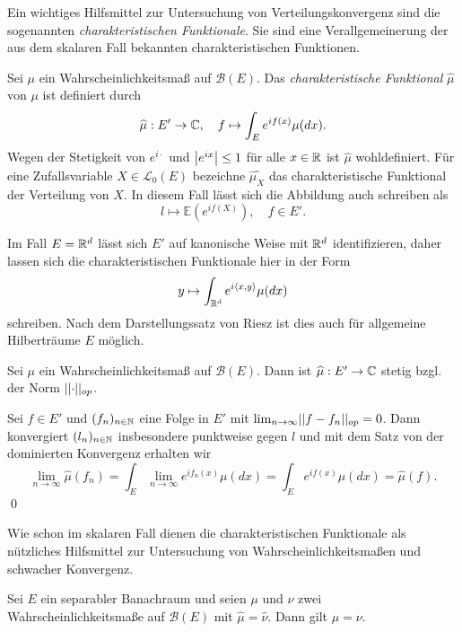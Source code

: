 Ein wichtiges Hilfsmittel zur Untersuchung von Verteilungskonvergenz sind die sogenannten \textit{charakteristischen Funktionale}. 
Sie sind eine Verallgemeinerung der aus dem skalaren Fall bekannten charakteristischen Funktionen.  

\begin{mydef}
    Sei $\mu$ ein Wahrscheinlichkeitsmaß auf $\mathcal{B}(E)$. 
    Das \textit{charakteristische Funktional} $\widehat{\mu}$ von $\mu$ ist definiert durch
    $$
        \widehat{\mu} : E' \to \mathbb{C}, \quad f \mapsto \int_{E}e^{if(x)}\mu(dx).
    $$
    Wegen der Stetigkeit von $e^{i\cdot}$ und $\left| e^{ix} \right|\leq 1$ für alle $x \in \mathbb{R}$ ist $\widehat{\mu}$ wohldefiniert. 
    Für eine Zufallsvariable $X \in \mathcal{L}_0(E)$ bezeichne $\widehat{\mu_X}$ das charakteristische Funktional der Verteilung von $X$. In diesem Fall lässt sich die Abbildung auch schreiben als
    $$
        l \mapsto \mathbb{E}(e^{if(X)}), \quad f \in E'. 
    $$
\end{mydef}

\begin{remark}
    Im Fall $E = \mathbb{R}^d$ lässt sich $E'$ auf kanonische Weise mit $\mathbb{R}^d$ identifizieren, daher lassen sich die charakteristischen Funktionale hier in der Form 
    $$
        y \mapsto \int_{\mathbb{R}^d}e^{i\langle x, y\rangle}\mu(dx)
    $$
    schreiben. Nach dem Darstellungssatz von Riesz ist dies auch für allgemeine Hilberträume $E$ möglich. 
\end{remark}

\begin{proposition}
    Sei $\mu$ ein Wahrscheinlichkeitsmaß auf $\mathcal{B}(E)$. Dann ist $\widehat{\mu}:E' \to \mathbb{C}$ stetig bzgl. der Norm $\lvert\lvert \cdot \rvert\rvert_{op}$. 
\end{proposition}
\begin{proof*}
    Sei $f \in E'$ und $(f_n)_{n \in \mathbb{N}}$ eine Folge in $E'$ mit $\lim_{n \to \infty}\lvert\lvert f-f_n \rvert\rvert_{op} = 0$. 
    Dann konvergiert $(l_n)_{n \in \mathbb{N}}$ insbesondere punktweise gegen $l$ und mit dem Satz von der dominierten Konvergenz erhalten wir 
    $$
        \lim_{n \to \infty} \widehat{\mu}(f_n) = \int_E\lim_{n \to \infty}e^{if_n(x)}\mu(dx) = \int_E e^{if(x)}\mu(dx) = \widehat{\mu}(f). 
    $$
    \qed
\end{proof*}

Wie schon im skalaren Fall dienen die charakteristischen Funktionale als nützliches Hilfsmittel zur Untersuchung von Wahrscheinlichkeitsmaßen und schwacher Konvergenz.

\begin{theorem}[Eindeutigkeitssatz]
    Sei $E$ ein separabler Banachraum und seien $\mu$ und $\nu$ zwei Wahrscheinlichkeitsmaße auf $\mathcal{B}(E)$ mit $\widehat{\mu} = \widehat{\nu}$. Dann gilt $\mu = \nu$.
\end{theorem}

